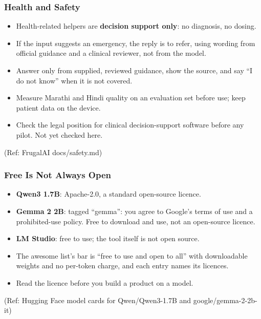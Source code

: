 \begin{frame}[fragile]\frametitle{Health and Safety}
\begin{itemize}
\item Health-related helpers are \textbf{decision support only}: no diagnosis, no dosing.
\item If the input suggests an emergency, the reply is to refer, using wording from official guidance and a clinical reviewer, not from the model.
\item Answer only from supplied, reviewed guidance, show the source, and say ``I do not know'' when it is not covered.
\item Measure Marathi and Hindi quality on an evaluation set before use; keep patient data on the device.
\item Check the legal position for clinical decision-support software before any pilot. Not yet checked here.
\end{itemize}
{\tiny (Ref: FrugalAI docs/safety.md)}
\end{frame}

\begin{frame}[fragile]\frametitle{Free Is Not Always Open}
\begin{itemize}
\item \textbf{Qwen3 1.7B}: Apache-2.0, a standard open-source licence.
\item \textbf{Gemma 2 2B}: tagged ``gemma'': you agree to Google's terms of use and a prohibited-use policy. Free to download and use, not an open-source licence.
\item \textbf{LM Studio}: free to use; the tool itself is not open source.
\item The awesome list's bar is ``free to use and open to all'' with downloadable weights and no per-token charge, and each entry names its licences.
\item Read the licence before you build a product on a model.
\end{itemize}
{\tiny (Ref: Hugging Face model cards for Qwen/Qwen3-1.7B and google/gemma-2-2b-it)}
\end{frame}
